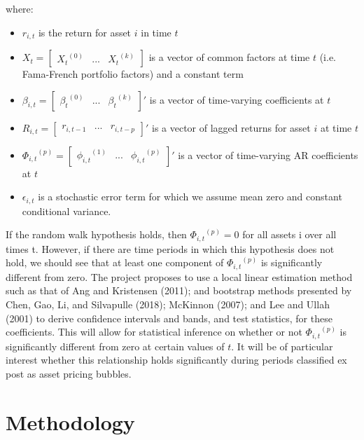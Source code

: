 \documentclass{article}
\begin{document}
where:
\begin{itemize}
	\item{\(r_{i,t}\) is the return for asset \(i\) in time \(t\)}
	\item{\(X_{t} = \begin{bmatrix}{X_{t}}^{(0)}&...&{X_{t}}^{(k)}\end{bmatrix}\) is a vector of common factors at time \(t\) (i.e. Fama-French portfolio factors) and a constant term}
	\item{\(\beta_{i,t} = \begin{bmatrix}{\beta_{t}}^{(0)}&...&{\beta_{t}}^{(k)}\end{bmatrix}'\) is a vector of time-varying coefficients at \(t\)}
	\item{\(R_{i,t} = \begin{bmatrix}r_{i,t-1}&...&r_{i,t-p}\end{bmatrix}'\) is a vector of lagged returns for asset \(i\) at time \(t\)}
	\item{\({\Phi_{i,t}}^{(p)} = \begin{bmatrix}{\phi_{i,t}}^{(1)}&...&{\phi_{i,t}}^{(p)}\end{bmatrix}'\) is a vector of time-varying AR coefficients at \(t\)}
	\item{\(\epsilon_{i,t}\) is a stochastic error term for which we assume mean zero and constant conditional variance.}
\end{itemize}

\noindent
If the random walk hypothesis holds, then \({\Phi_{i,t}}^{(p)} = 0\) for all assets i over all times t. However, if there are time periods in which this hypothesis does not hold, we should see that at least one component of  \({\Phi_{i,t}}^{(p)}\) is significantly different from zero. The project proposes to use a local linear estimation method such as that of Ang and Kristensen (2011); and bootstrap methods presented by Chen, Gao, Li, and Silvapulle (2018); McKinnon (2007); and Lee and Ullah (2001) to derive confidence intervals and bands, and test statistics, for these coefficients. This will allow for statistical inference on whether or not  \({\Phi_{i,t}}^{(p)}\)  is significantly different from zero at certain values of \(t\). It will be of particular interest whether this relationship holds significantly during periods classified ex post as asset pricing bubbles.

\section{Methodology}
\end{document}
